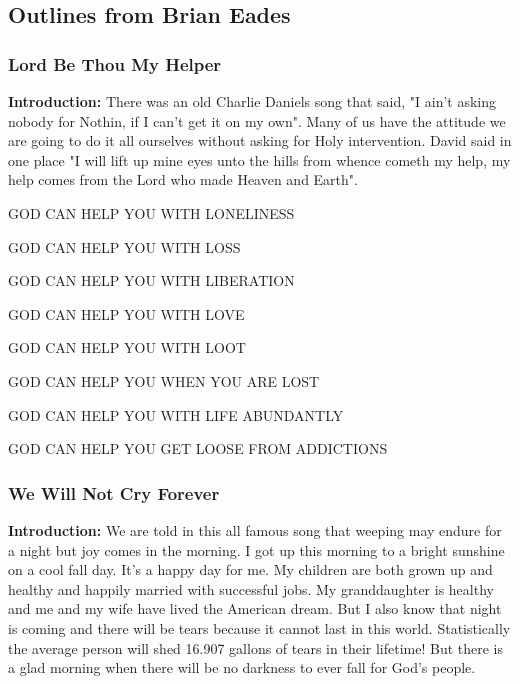 \subsection{Outlines from Brian Eades}

\subsubsection{Lord Be Thou My Helper}

\textbf{Introduction: }There was an old Charlie Daniels song that said, "I ain't asking nobody for Nothin, if I can't get it on my own". Many of us have the attitude we are going to do it all ourselves without asking for Holy intervention. David said in one place "I will lift up mine eyes unto the hills from whence cometh my help, my help comes from the Lord who made Heaven and Earth".\\

\begin{compactenum}
    \item GOD CAN HELP YOU WITH LONELINESS
    \item GOD CAN HELP YOU WITH LOSS
    \item GOD CAN HELP YOU WITH LIBERATION
    \item GOD CAN HELP YOU WITH LOVE
    \item GOD CAN HELP YOU WITH LOOT
    \item GOD CAN HELP YOU WHEN YOU ARE LOST
    \item GOD CAN HELP YOU WITH LIFE ABUNDANTLY
    \item GOD CAN HELP YOU GET LOOSE FROM ADDICTIONS
\end{compactenum}




\subsubsection{We Will Not Cry Forever}

\textbf{Introduction: }We are told in this all famous song that weeping may endure for a night but joy comes in the morning. I got up this morning to a bright sunshine on a cool fall day. It's a happy day for me. My children are both grown up and healthy and happily married with successful jobs. My granddaughter is healthy and me and my wife have lived the American dream. But I also know that night is coming and there will be tears because it cannot last in this world. Statistically the average person will shed 16.907 gallons of tears in their lifetime!  But there is a glad morning when there will be no darkness to ever fall for God's people.\\

